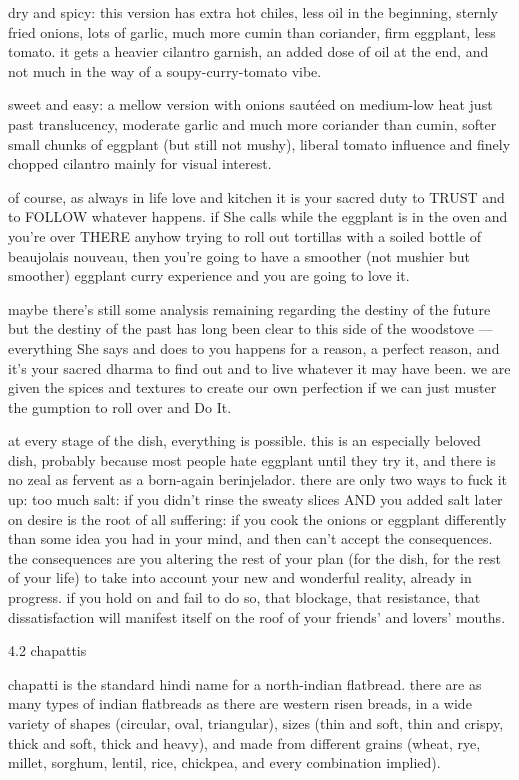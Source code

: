 dry and spicy: this version has extra hot chiles, less oil in the beginning, sternly fried onions, lots of garlic, much more cumin than coriander, firm eggplant, less tomato. it gets a heavier cilantro garnish, an added dose of oil at the end, and not much in the way of a soupy-curry-tomato vibe.

sweet and easy: a mellow version with onions saut\'{e}ed on medium-low heat just past translucency, moderate garlic and much more coriander than cumin, softer small chunks of eggplant (but still not mushy), liberal tomato influence and finely chopped cilantro mainly for visual interest. 

of course, as always in life love and kitchen it is your sacred duty to TRUST and to FOLLOW whatever happens. if She calls while the eggplant is in the oven and you're over THERE anyhow trying to roll out tortillas with a soiled bottle of beaujolais nouveau, then you're going to have a smoother (not mushier but smoother) eggplant curry experience and you are going to love it.

maybe there's still some analysis remaining regarding the destiny of the future but the destiny of the past has long been clear to this side of the woodstove --- everything She says and does to you happens for a reason, a perfect reason, and it's your sacred dharma to find out and to live whatever it may have been. we are given the spices and textures to create our own perfection if we can just muster the gumption to roll over and Do It.

at every stage of the dish, everything is possible. this is an especially beloved dish, probably because most people hate eggplant until they try it, and there is no zeal as fervent as a born-again berinjelador. there are only two ways to fuck it up:
	too much salt: if you didn't rinse the sweaty slices AND you added salt later on
	desire is the root of all suffering: if you cook the onions or eggplant differently than some idea you had in your mind, and then can't accept the consequences. the consequences are you altering the rest of your plan (for the dish, for the rest of your life) to take into account your new and wonderful reality, already in progress. if you hold on and fail to do so, that blockage, that resistance, that dissatisfaction will manifest itself on the roof of your friends' and lovers' mouths.

4.2  chapattis

chapatti is the standard hindi name for a north-indian flatbread. there are as many types of indian flatbreads as there are western risen breads, in a wide variety of shapes (circular, oval, triangular), sizes (thin and soft, thin and crispy, thick and soft, thick and heavy), and made from different grains (wheat, rye, millet, sorghum, lentil, rice, chickpea, and every combination implied).

